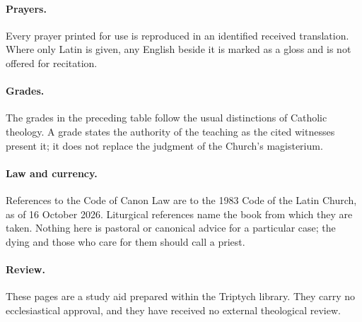 \paragraph{Prayers.} Every prayer printed for use is reproduced in an identified received translation. Where only Latin is given, any English beside it is marked as a gloss and is not offered for recitation.

\paragraph{Grades.} The grades in the preceding table follow the usual distinctions of Catholic theology. A grade states the authority of the teaching as the cited witnesses present it; it does not replace the judgment of the Church's magisterium.

\paragraph{Law and currency.} References to the Code of Canon Law are to the 1983 Code of the Latin Church, as of 16 October 2026. Liturgical references name the book from which they are taken. Nothing here is pastoral or canonical advice for a particular case; the dying and those who care for them should call a priest.

\paragraph{Review.} These pages are a study aid prepared within the Triptych library. They carry no ecclesiastical approval, and they have received no external theological review.
